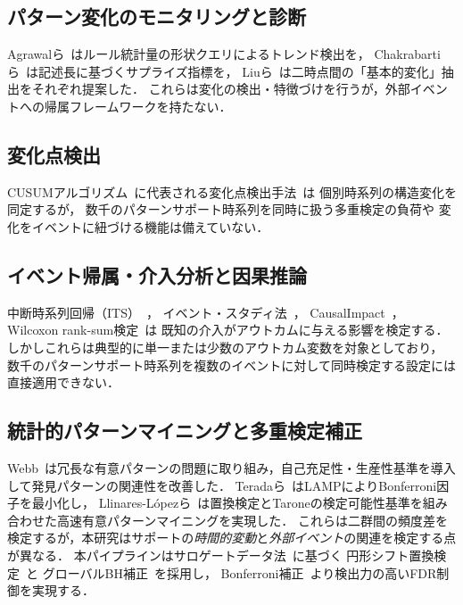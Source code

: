 \subsection{パターン変化のモニタリングと診断}

Agrawalら~\cite{agrawal1995active}はルール統計量の形状クエリによるトレンド検出を，
Chakrabartiら~\cite{chakrabarti1998mining}は記述長に基づくサプライズ指標を，
Liuら~\cite{liu2001fundamental}は二時点間の「基本的変化」抽出をそれぞれ提案した．
これらは変化の検出・特徴づけを行うが，外部イベントへの帰属フレームワークを持たない．

\subsection{変化点検出}

CUSUMアルゴリズム~\cite{page1954continuous}に代表される変化点検出手法~\cite{aminikhanghahi2017survey}は
個別時系列の構造変化を同定するが，
数千のパターンサポート時系列を同時に扱う多重検定の負荷や
変化をイベントに紐づける機能は備えていない．

\subsection{イベント帰属・介入分析と因果推論}

中断時系列回帰（ITS）~\cite{bernal2017interrupted}，
イベント・スタディ法~\cite{mackinlay1997event}，
CausalImpact~\cite{brodersen2015causalimpact}，
Wilcoxon rank-sum検定~\cite{mann1947test}は
既知の介入がアウトカムに与える影響を検定する．
しかしこれらは典型的に単一または少数のアウトカム変数を対象としており，
数千のパターンサポート時系列を複数のイベントに対して同時検定する設定には直接適用できない．

\subsection{統計的パターンマイニングと多重検定補正}

Webb~\cite{webb2007discovering,webb2011filtered}は冗長な有意パターンの問題に取り組み，自己充足性・生産性基準を導入して発見パターンの関連性を改善した．
Teradaら~\cite{terada2013statistical}はLAMPによりBonferroni因子を最小化し，
Llinares-Lópezら~\cite{llinares2015fast}は置換検定とTaroneの検定可能性基準を組み合わせた高速有意パターンマイニングを実現した．
これらは二群間の頻度差を検定するが，本研究はサポートの\emph{時間的変動}と\emph{外部イベント}の関連を検定する点が異なる．
本パイプラインはサロゲートデータ法~\cite{theiler1992testing}に基づく
円形シフト置換検定~\cite{davison1997bootstrap,yuan2024rigorous}と
グローバルBH補正~\cite{benjamini1995controlling,benjamini2001control}を採用し，
Bonferroni補正~\cite{dunn1961multiple}より検出力の高いFDR制御を実現する．

